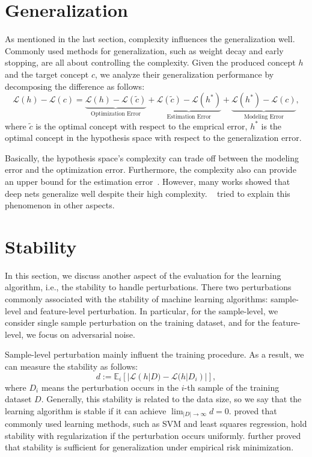 \documentclass[a4paper,11pt]{article}
\begin{document}
\section{Generalization}
\label{sec:Generalization}

As mentioned in the last section, complexity influences the generalization well. Commonly used methods for generalization, such as weight decay and early stopping, are all about controlling the complexity. Given the produced concept $h$ and the target concept $c$, we analyze their generalization performance by decomposing the difference as follows: $$\mathcal{L}(h) - \mathcal{L}(c) = \underbrace{\mathcal{L}(h) - \mathcal{L}(\tilde{c})}_{\text{Optimization Error}} + \underbrace{\mathcal{L}(\tilde{c}) - \mathcal{L}(h^*)}_{\text{Estimation Error}} + \underbrace{\mathcal{L}(h^*) - \mathcal{L}(c)}_{\text{Modeling Error}},$$ where $\tilde{c}$ is the optimal concept with respect to the emprical error, $h^*$ is the optimal concept in the hypothesis space with respect to the generalization error.

Basically, the hypothesis space's complexity can trade off between the modeling error and the optimization error. Furthermore, the complexity also can provide an upper bound for the estimation error~\citep{vapnik1971uniform,bartlett2002rademacher}. However, many works showed that deep nets generalize well despite their high complexity. ~\citep{arora2018stronger,neyshabur2018towards,zhang2016understanding} tried to explain this phenomenon in other aspects.


\section{Stability}
\label{sec:Stability}

In this section, we discuss another aspect of the evaluation for the learning algorithm, i.e., the stability to handle perturbations. There two perturbations commonly associated with the stability of machine learning algorithms: sample-level and feature-level perturbation. In particular, for the sample-level, we consider single sample perturbation on the training dataset, and for the feature-level, we focus on adversarial noise. 

Sample-level perturbation mainly influent the training procedure. As a result, we can measure the stability as follows: $$d := \mathbb{E}_i[|\mathcal{L}(h|D) - \mathcal{L}(h|D_i)|],$$ where $D_i$ means the perturbation occurs in the $i$-th sample of the training dataset $D$. Generally, this stability is related to the data size, so we say that the learning algorithm is stable if it can achieve $\lim_{|D|\rightarrow \infty} d = 0$. \citet{bousquet2002stability} proved that commonly used learning methods, such as SVM and least squares regression, hold stability with regularization if the perturbation occurs uniformly. \citet{mukherjee2006learning} further proved that stability is sufficient for generalization under empirical risk minimization.
\end{document}
